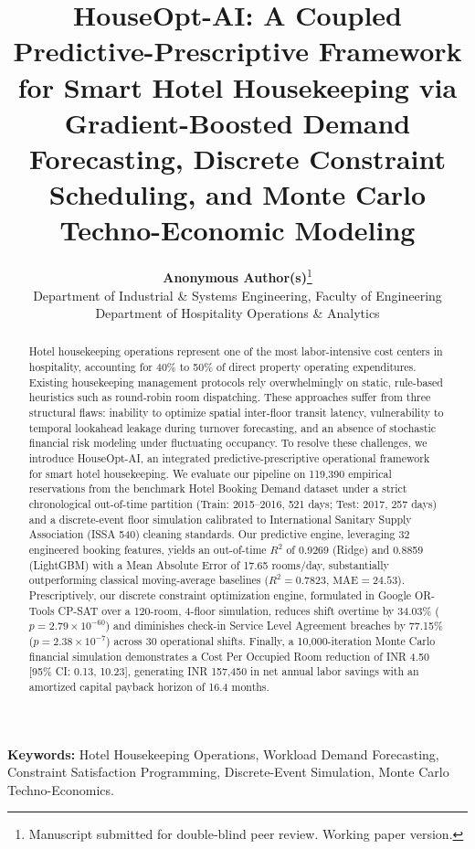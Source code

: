 \documentclass[11pt,a4paper]{article}
\title{\textbf{HouseOpt-AI: A Coupled Predictive-Prescriptive Framework for Smart Hotel Housekeeping via Gradient-Boosted Demand Forecasting, Discrete Constraint Scheduling, and Monte Carlo Techno-Economic Modeling}}
\author{
    \textbf{Anonymous Author(s)}\footnote{Manuscript submitted for double-blind peer review. Working paper version.}\\
    Department of Industrial \& Systems Engineering, Faculty of Engineering\\
    Department of Hospitality Operations \& Analytics
}
\date{}
\begin{document}
\maketitle

\begin{abstract}
Hotel housekeeping operations represent one of the most labor-intensive cost centers in hospitality, accounting for 40\% to 50\% of direct property operating expenditures. Existing housekeeping management protocols rely overwhelmingly on static, rule-based heuristics such as round-robin room dispatching. These approaches suffer from three structural flaws: inability to optimize spatial inter-floor transit latency, vulnerability to temporal lookahead leakage during turnover forecasting, and an absence of stochastic financial risk modeling under fluctuating occupancy. To resolve these challenges, we introduce HouseOpt-AI, an integrated predictive-prescriptive operational framework for smart hotel housekeeping. We evaluate our pipeline on 119,390 empirical reservations from the benchmark Hotel Booking Demand dataset under a strict chronological out-of-time partition (Train: 2015--2016, 521 days; Test: 2017, 257 days) and a discrete-event floor simulation calibrated to International Sanitary Supply Association (ISSA 540) cleaning standards. Our predictive engine, leveraging 32 engineered booking features, yields an out-of-time $R^2$ of 0.9269 (Ridge) and 0.8859 (LightGBM) with a Mean Absolute Error of 17.65 rooms/day, substantially outperforming classical moving-average baselines ($R^2 = 0.7823$, $\text{MAE} = 24.53$). Prescriptively, our discrete constraint optimization engine, formulated in Google OR-Tools CP-SAT over a 120-room, 4-floor simulation, reduces shift overtime by 34.03\% ($p = 2.79 \times 10^{-60}$) and diminishes check-in Service Level Agreement breaches by 77.15\% ($p = 2.38 \times 10^{-7}$) across 30 operational shifts. Finally, a 10,000-iteration Monte Carlo financial simulation demonstrates a Cost Per Occupied Room reduction of INR 4.50 [95\% CI: 0.13, 10.23], generating INR 157,450 in net annual labor savings with an amortized capital payback horizon of 16.4 months.
\end{abstract}

\vspace{0.5em}
\noindent\textbf{Keywords:} Hotel Housekeeping Operations, Workload Demand Forecasting, Constraint Satisfaction Programming, Discrete-Event Simulation, Monte Carlo Techno-Economics.

\vspace{1.5em}
\end{document}

